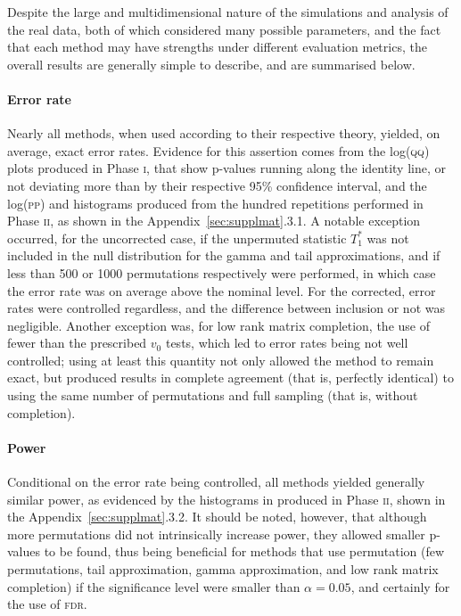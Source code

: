Despite the large and multidimensional nature of the simulations and analysis of the real data, both of which considered many possible parameters, and the fact that each method may have strengths under different evaluation metrics, the overall results are generally simple to describe, and are summarised below.

\paragraph{Error rate} Nearly all methods, when used according to their respective theory, yielded, on average, exact error rates. Evidence for this assertion comes from the log(\textsc{qq}) plots produced in Phase \textsc{i}, that show p-values running along the identity line, or not deviating more than by their respective 95\% confidence interval, and the log(\textsc{pp}) and histograms produced from the hundred repetitions performed in Phase \textsc{ii}, as shown in the Appendix~\ref{sec:supplmat}.3.1. A notable exception occurred, for the uncorrected case, if the unpermuted statistic $T^*_1$ was not included in the null distribution for the gamma and tail approximations, and if less than 500 or 1000 permutations respectively were performed, in which case the error rate was on average above the nominal level. For the corrected, error rates were controlled regardless, and the difference between inclusion or not was negligible. Another exception was, for low rank matrix completion, the use of fewer than the prescribed $v_0$ tests, which led to error rates being not well controlled; using at least this quantity not only allowed the method to remain exact, but produced results in complete agreement (that is, perfectly identical) to using the same number of permutations and full sampling (that is, without completion).

\paragraph{Power} Conditional on the error rate being controlled, all methods yielded generally similar power, as evidenced by the histograms in produced in Phase \textsc{ii}, shown in the Appendix~\ref{sec:supplmat}.3.2. It should be noted, however, that although more permutations did not intrinsically increase power, they allowed smaller p-values to be found, thus being beneficial for methods that use permutation (few permutations, tail approximation, gamma approximation, and low rank matrix completion) if the significance level were smaller than $\alpha = 0.05$, and certainly for the use of \textsc{fdr}.


